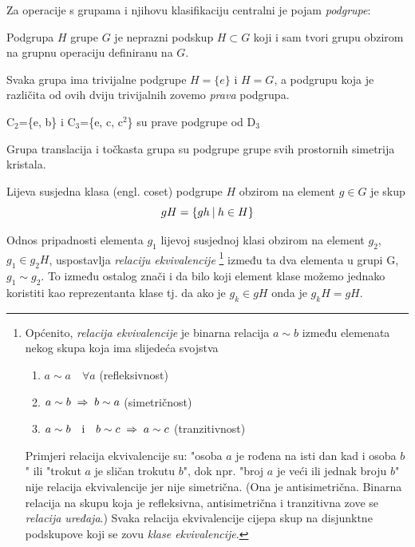 Za operacije s grupama i njihovu klasifikaciju centralni je pojam \emph{podgrupe}:

\begin{definicija}[Podgrupa]
Podgrupa $H$ grupe $G$ je neprazni podskup $H\subset G$ koji i sam
tvori grupu obzirom na grupnu operaciju definiranu na $G$.
\end{definicija}

Svaka grupa ima trivijalne podgrupe $H=\{e\}$ i $H=G$, a
podgrupu koja je različita od ovih dviju trivijalnih
zovemo \emph{prava} podgrupa.

\begin{primjer} \label{th:c2c3}
C$_2$=\{e, b\} i C$_3$=\{e, c, c$^2$\} su prave podgrupe od D$_3$
\end{primjer}

\begin{primjer}
Grupa translacija i točkasta grupa su podgrupe grupe svih prostornih
simetrija kristala.
\end{primjer}

\begin{definicija}
Lijeva susjedna klasa (engl. coset) podgrupe $H$ obzirom na element
$g\in G$ je skup
\begin{displaymath}
     gH=\{gh \: | \: h\in H\}
\end{displaymath}
\end{definicija}

Odnos pripadnosti elementa $g_1$ lijevoj susjednoj klasi obzirom na element $g_2$,  
$g_1 \in g_2 H$, uspostavlja \emph{relaciju ekvivalencije}%
\footnote{\label{fn:ekviv}
Općenito, \emph{relacija ekvivalencije} je binarna relacija $a\sim b$ između
elemenata nekog
skupa koja ima slijedeća svojstva
\begin{enumerate}
\item $a\sim a \quad \forall a$ \qquad (refleksivnost)
\item $a\sim b \;\Rightarrow\; b\sim a$   \qquad (simetričnost)
\item $a\sim b \quad \textrm{i}\quad  b\sim c \;\Rightarrow\; a\sim c$  \qquad (tranzitivnost)
\end{enumerate}
Primjeri relacija ekvivalencije su: "osoba $a$ je rođena na isti dan kad i osoba $b$"
ili "trokut $a$ je sličan trokutu $b$", dok npr. "broj $a$ je veći ili jednak
broju $b$" nije relacija ekvivalencije jer nije simetrična.
(Ona je antisimetrična. Binarna relacija na skupu koja je refleksivna, antisimetrična
i tranzitivna zove se \emph{relacija uređaja}.)
Svaka relacija ekvivalencije cijepa skup na disjunktne podskupove 
koji se zovu \emph{klase ekvivalencije}.} između ta dva elementa u grupi G, $g_1 \sim g_2$.
To između ostalog znači i da bilo koji element klase možemo jednako koristiti
kao reprezentanta klase tj. da ako je $g_k \in gH$ onda je $g_{k}H = gH$.

